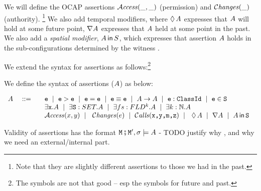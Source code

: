 We will define the OCAP assertions ${\mathcal{A}}\textrm{\textit{ccess}}(\_,\_)$  (permission)
and   $\mathcal{C}\textrm{\textit{hanges}}(\_)$ (authority). \footnote{Note that they are slightly different
assertions to those we had in the past.}
We also add temporal modifiers, where $\lozenge\, A$ expresses that $A$ will hold at some future point,
$\nabla A$ expresses that $A$ held at some point in the past.
We also add a {\em spatial modifier}, $A\,{\bf{\sf {in}}}\, S$, which expresses that assertion $A$ holds in
the sub-configurations determined by the witness .

We extend the syntax for assertions as follows:\footnote{The symbols are not that good -- esp the symbols for future and past.}

\begin{definition}[Assertions]We define the syntax of assertions ($A$) as below:
\label{def:assertions}

$\begin{array}{lcl}
\A &\ ::=\    \ \  & \SE  \ \mid \ \SE > \SE \ \mid \  \SE=\SE  \ \mid \ \SE \equiv \SE \ \mid  \ \A \rightarrow \A \ \mid \   \SE:\prg{ClassId}  \ \mid \   
    \SE\in\prg{S}  \\
 & &   \exists \x.\A  \ \mid \  \exists \prg{S}:SET.\A  \ \mid \  \exists fs:FLD^k.\A
 \ \mid \  \exists k:\mathbb{N}.\A  
\\
 & &    \CanAccess x y \ \mid\  \ \Changes e \ \mid\  \Calls{\prg{x},\prg{y},\prg{m},\prg{z}} \ \mid\  \  \Future \A  \ \mid \  \Past \A \ \mid \ \Using \A \prg{S }
\end{array}$
\end{definition} 

Validity of assertions has the format ${\mbox{\tt{\ensuremath{{\mbox{\tt{M}}}}}}}\fatsemi {\mbox{\tt{\ensuremath{{\mbox{\tt{M}}}}}}}', \sigma \models A$ - TODO justify why \M, and why we need an external/internal part.

